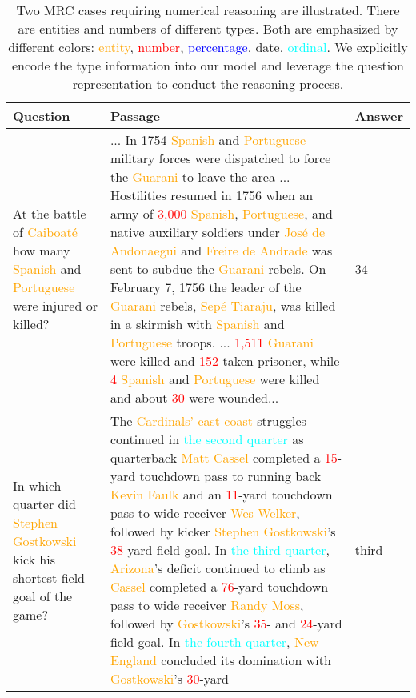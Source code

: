 \documentclass{article}
\begin{document}
\begin{table*}[t]
\scriptsize
\caption{Two MRC cases requiring numerical reasoning are illustrated. There are entities and numbers of different types. Both are emphasized by different colors: \textcolor{orange}{entity}, \textcolor{red}{number}, \textcolor{blue}{percentage}, \textcolor{NavyBlue}{date}, \textcolor{cyan}{ordinal}. We explicitly encode the type information into our model and leverage the question representation to conduct the reasoning process. 
}
\begin{tabularx}{\linewidth}{jik}
\toprule
Question & Passage & Answer \\ \midrule
At the battle of \textcolor{orange}{Caiboaté} how many \textcolor{orange}{Spanish} and \textcolor{orange}{Portuguese} were injured or killed? & 
... In \textcolor{NavyBlue}{1754} \textcolor{orange}{Spanish} and \textcolor{orange}{Portuguese} military forces were dispatched to force the \textcolor{orange}{Guarani} to leave the area ... Hostilities resumed in \textcolor{NavyBlue}{1756} when an army of \textcolor{red}{3,000} \textcolor{orange}{Spanish}, \textcolor{orange}{Portuguese}, and native auxiliary soldiers under \textcolor{orange}{José de Andonaegui} and \textcolor{orange}{Freire de Andrade} was sent to subdue the \textcolor{orange}{Guarani} rebels. On \textcolor{NavyBlue}{February 7, 1756} the leader of the \textcolor{orange}{Guarani} rebels, \textcolor{orange}{Sepé Tiaraju}, was killed in a skirmish with \textcolor{orange}{Spanish} and \textcolor{orange}{Portuguese} troops. ... \textcolor{red}{1,511} \textcolor{orange}{Guarani} were killed and \textcolor{red}{152} taken prisoner, while \textcolor{red}{4} \textcolor{orange}{Spanish} and \textcolor{orange}{Portuguese} were killed and about \textcolor{red}{30} were wounded...& 34 \\ \midrule
In which quarter did \textcolor{orange}{Stephen Gostkowski} kick his shortest field goal of the game? &
The \textcolor{orange}{Cardinals' east coast} struggles continued in \textcolor{cyan}{the second quarter} as quarterback \textcolor{orange}{Matt Cassel} completed a \textcolor{red}{15}-yard touchdown pass to running back \textcolor{orange}{Kevin Faulk} and an \textcolor{red}{11}-yard touchdown pass to wide receiver \textcolor{orange}{Wes Welker}, followed by kicker \textcolor{orange}{Stephen Gostkowski}'s \textcolor{red}{38}-yard field goal. In \textcolor{cyan}{the third quarter}, \textcolor{orange}{Arizona}'s deficit continued to climb as \textcolor{orange}{Cassel} completed a \textcolor{red}{76}-yard touchdown pass to wide receiver \textcolor{orange}{Randy Moss}, followed by \textcolor{orange}{Gostkowski}'s \textcolor{red}{35}- and \textcolor{red}{24}-yard field goal. In \textcolor{cyan}{the fourth quarter}, \textcolor{orange}{New England} concluded its domination with \textcolor{orange}{Gostkowski}'s \textcolor{red}{30}-yard & third  \\
\bottomrule
\end{tabularx}

\label{tab:example}
\end{table*}
\end{document}

